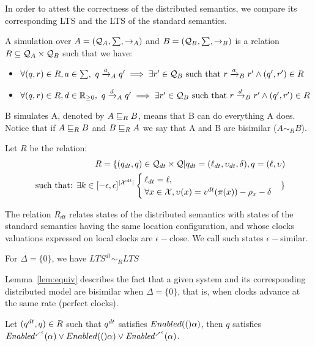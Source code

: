 In order to attest the correctness of the distributed semantics, we compare
its corresponding LTS and the LTS of the standard semantics.

\begin{definition}[Simulation]\label{def:sim}
  A simulation over $A=(\mathcal{Q}_A,\sum,\to_A)$ and $B=(\mathcal{Q}_B,\sum,
  \to_B)$ is a relation $R\subseteq \mathcal{Q}_A\times \mathcal{Q}_B$ such that we have:
  \begin{itemize}
    \item $\forall(q,r)\in R, a\in \sum, \ q\transit{a}_A q'\implies\exists r'\in\Q_B 
      \text{ such that } r\transit{a}_B r'\wedge (q',r')\in R$
    \item $\forall(q,r)\in R, d\in\realpoz, \ q\transit{d}_A q'\implies\exists r'\in\Q_B 
      \text{ such that } r\transit{d}_B r'\wedge (q',r')\in R$
  \end{itemize}
  B simulates A, denoted by $A\sqsubseteq_{R}B$, means that B can do everything A does.
  Notice that if $A\sqsubseteq_{R}B$ and $B\sqsubseteq_{R}A$ we say that A and B are bisimilar ($A\sim_{R} B$). 
\end{definition}

Let $R$ be the relation:
\begin{align*}
  R=\{(q_{dt},q)\in\mathcal{Q}_{dt}\times\mathcal{Q}|q_{dt}=(\ell_{dt},\upsilon_{dt},\delta), q=(\ell,\upsilon) \\
  \text{ such that: }\exists k\in[-\epsilon,\epsilon]^{|\mathcal{X}^{dt}|}  
  \begin{cases}
  \ell_{dt}=\ell,\\
    \forall x\in\mathcal{X},\upsilon(x)=v^{dt}(\pi(x))-\rho_x-\delta  
  \end{cases}\}
\end{align*}

The relation $R_{dt}$ relates states of the distributed semantics with
states of the standard semantics having the same location configuration,
and whose clocks valuations expressed on local clocks are $\epsilon-$close. 
We call such states $\epsilon-$similar.

\begin{lemma}\label{lem:equiv}
  For $\Delta=\{0\}$, we have $LTS^{dt}\sim_{R}LTS$ 
\end{lemma}

Lemma~\ref{lem:equiv} describes the fact that a given system and its corresponding distributed model are bisimilar
when $\Delta=\{0\}$, that is, when clocks advance at the same rate (perfect clocks). 

\begin{property}\label{pr:enabled1}
  Let $(q^{dt},q)\in R$ such that $q^{dt}$ satisfies $Enabled(()\alpha)$, then
  $q$ satisfies $\mathit{Enabled}^{{\scriptscriptstyle \swarrow^{\epsilon}}}(\alpha)\vee Enabled(()\alpha)\vee\mathit{Enabled}^{{\scriptscriptstyle \nearrow^{\epsilon}}}(\alpha)$.
\end{property}

